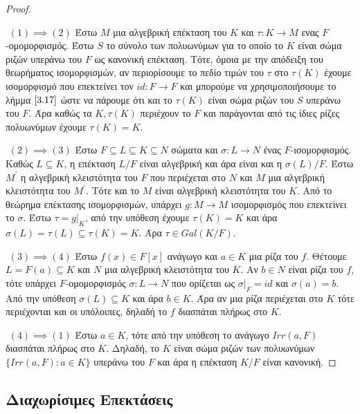 \documentclass[oneside,a4paper]{article}
\begin{document}
\begin{proof} $ $

	$ $\newline
	$(1) \implies (2)$ Έστω $M$ μια αλγεβρική επέκταση του $K$ και $\tau :K \rightarrow M$ ενας $F$-ομομορφισμός. Έστω $S$ το σύνολο των πολυωνύμων για το οποίο το $K$ είναι σώμα ριζών υπεράνω του $F$ ως κανονική επέκταση. Τότε, όμοια με την απόδειξη του θεωρήματος ισομορφισμών, αν περιορίσουμε το πεδίο τιμών του $\tau$ στο $\tau (K)$ έχουμε ισομορφισμό που επεκτείνει τον $id : F \rightarrow F$ και μπορούμε να χρησιμοποιήσουμε το λήμμα $\ref{3.17}$ ώστε να πάρουμε ότι και το $\tau (K)$ είναι σώμα ριζών του $S$ υπεράνω του $F$. Άρα καθώς τα $K,\tau (K)$ περιέχουν το $F$ και παράγονται από τις ίδιες ρίζες πολυωνύμων έχουμε $\tau (K) = K$.

	$ $\newline
	\noindent $(2) \implies (3)$ Έστω $F \subseteq L \subseteq K \subseteq N$ σώματα και $\sigma : L \rightarrow N$ ένας $F$-ισομορφισμός. Καθώς $L\subseteq K$, η επέκταση $L/F$ είναι αλγεβρική και άρα είναι και η $\sigma (L)/F$. Έστω $M^{\prime}$ η αλγεβρική κλειστότητα του $F$ που περιέχεται στο $N$ και $M$ μια αλγεβρική κλειστότητα του $M^{\prime}$. Τότε και το $M$ είναι αλγεβρική κλειστότητα του $K$. Από το θεώρημα επέκτασης ισομορφισμών, υπάρχει $g : M\rightarrow M$ ισομορφισμός που επεκτείνει το $\sigma$. Έστω $\tau = g|_K$, από την υπόθεση έχουμε $\tau(K) = K$ και άρα $\sigma (L) = \tau(L) \subseteq \tau (K) = K$. Άρα $\tau \in Gal(K/F)$.

	$ $\newline
	\noindent $(3) \implies (4)$ Έστω $f(x) \in F[x]$ ανάγωγο και $a \in K$ μια ρίζα του $f$. Θέτουμε $L=F(a) \subseteq K$ και $N$ μια αλγεβρική κλειστότητα του $K$. Αν $b \in N$ είναι ρίζα του $f$, τότε υπάρχει $F$-ομομορφισμός $\sigma : L \rightarrow N$ που ορίζεται ως $\sigma|_F = id$ και $\sigma (a) = b$. Από την υπόθεση $\sigma (L) \subseteq K$ και άρα $b \in K$. Άρα αν μια ρίζα περιέχεται στο $K$ τότε περιέχονται και οι υπόλοιπες, δηλαδή το $f$ διασπάται πλήρως στο $K$.
	
	$ $\newline
	\noindent $(4) \implies (1)$ Έστω $a \in K$, τότε από την υπόθεση το ανάγωγο $Irr(a,F)$ διασπάται πλήρως στο $K$. Δηλαδή, το $K$ είναι σώμα ριζών των πολυωνύμων $\{Irr(a,F) : a \in K\}$ υπεράνω του $F$ και άρα η επέκταση $K/F$ είναι κανονική. 

\end{proof}

\subsection{Διαχωρίσιμες Επεκτάσεις}
\vspace{1cm}
\end{document}
